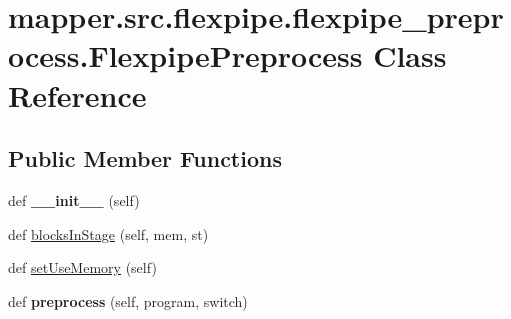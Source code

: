 \hypertarget{classmapper_1_1src_1_1flexpipe_1_1flexpipe__preprocess_1_1_flexpipe_preprocess}{}\section{mapper.\+src.\+flexpipe.\+flexpipe\+\_\+preprocess.\+Flexpipe\+Preprocess Class Reference}
\label{classmapper_1_1src_1_1flexpipe_1_1flexpipe__preprocess_1_1_flexpipe_preprocess}
\subsection*{Public Member Functions}
\begin{DoxyCompactItemize}
\item 
\hypertarget{classmapper_1_1src_1_1flexpipe_1_1flexpipe__preprocess_1_1_flexpipe_preprocess_a6116d0e9c4fe612a0919f3928374318d}{}def {\bfseries \+\_\+\+\_\+init\+\_\+\+\_\+} (self)\label{classmapper_1_1src_1_1flexpipe_1_1flexpipe__preprocess_1_1_flexpipe_preprocess_a6116d0e9c4fe612a0919f3928374318d}

\item 
def \hyperlink{classmapper_1_1src_1_1flexpipe_1_1flexpipe__preprocess_1_1_flexpipe_preprocess_ada22fa3f9028aebd76f1f2a0c28051d8}{blocks\+In\+Stage} (self, mem, st)
\item 
def \hyperlink{classmapper_1_1src_1_1flexpipe_1_1flexpipe__preprocess_1_1_flexpipe_preprocess_acfc43707e898746719bde300722c7c29}{set\+Use\+Memory} (self)
\item 
\hypertarget{classmapper_1_1src_1_1flexpipe_1_1flexpipe__preprocess_1_1_flexpipe_preprocess_a85caf8510392b73bd628dbe9df590f7b}{}def {\bfseries preprocess} (self, program, switch)\label{classmapper_1_1src_1_1flexpipe_1_1flexpipe__preprocess_1_1_flexpipe_preprocess_a85caf8510392b73bd628dbe9df590f7b}

\end{DoxyCompactItemize}
